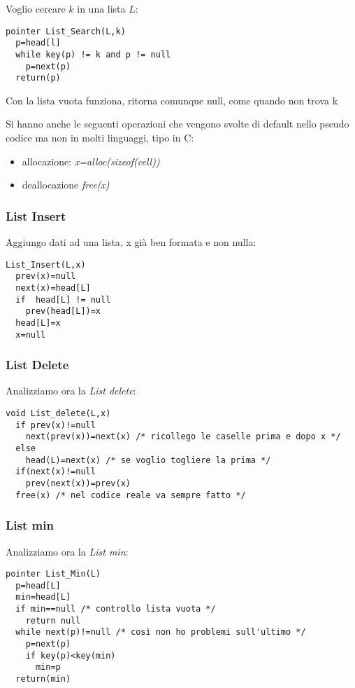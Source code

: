 \documentclass[a4paper,12pt,oneside,tikz]{book}
\begin{document}
\begin{esempio}
	Voglio cercare $k$ in una lista $L$:
	\begin{verbatim}
pointer List_Search(L,k)
  p=head[l]
  while key(p) != k and p != null
    p=next(p)
  return(p)
\end{verbatim}
	Con la lista vuota funziona, ritorna comunque null, come quando non trova k
\end{esempio}
Si hanno anche le seguenti operazioni che vengono svolte di default nello pseudo codice ma non in molti linguaggi, tipo in C:
\begin{itemize}
	\item allocazione: \textit{x=alloc(sizeof(cell))}
	\item deallocazione \textit{free(x)}
\end{itemize}
\newpage
\subsubsection{List Insert}
Aggiungo dati ad una lista, x già ben formata e non nulla:
\begin{verbatim}
List_Insert(L,x)
  prev(x)=null
  next(x)=head[L]
  if  head[L] != null
    prev(head[L])=x 
  head[L]=x
  x=null
\end{verbatim}

\subsubsection{List Delete}
Analizziamo ora la \textit{List delete}:
\begin{verbatim}
void List_delete(L,x)
  if prev(x)!=null
    next(prev(x))=next(x) /* ricollego le caselle prima e dopo x */
  else
    head(L)=next(x) /* se voglio togliere la prima */
  if(next(x)!=null
    prev(next(x))=prev(x)
  free(x) /* nel codice reale va sempre fatto */
\end{verbatim}
\subsubsection{List min}
Analizziamo ora la \textit{List min}:
\begin{verbatim}
pointer List_Min(L)
  p=head[L]
  min=head[L]
  if min==null /* controllo lista vuota */
    return null
  while next(p)!=null /* così non ho problemi sull'ultimo */
    p=next(p)
    if key(p)<key(min)
      min=p
  return(min)
\end{verbatim}

\newpage
\end{document}
